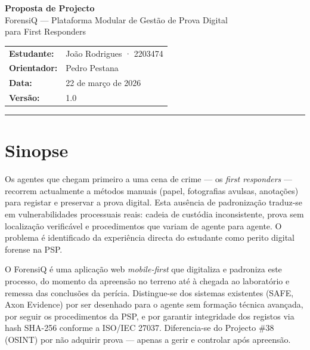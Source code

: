 \documentclass[a4paper,11pt]{article}
\begin{document}

\begin{center}
    {\LARGE\bfseries Proposta de Projecto}\\[0.8em]
    {\large ForensiQ --- Plataforma Modular de Gestão de Prova Digital\\
    para First Responders}\\[1.2em]
    \begin{tabular}{ll}
        \textbf{Estudante:}   & João Rodrigues · 2203474 \\
        \textbf{Orientador:}  & Pedro Pestana \\
        \textbf{Data:}        & 22 de março de 2026 \\
        \textbf{Versão:}      & 1.0 \\
    \end{tabular}
\end{center}

\vspace{0.5em}
\hrule
\vspace{1.5em}

\section{Sinopse}

Os agentes que chegam primeiro a uma cena de crime --- os \emph{first responders} ---
recorrem actualmente a métodos manuais (papel, fotografias avulsas, anotações) para
registar e preservar a prova digital. Esta ausência de padronização traduz-se em
vulnerabilidades processuais reais: cadeia de custódia inconsistente, prova sem
localização verificável e procedimentos que variam de agente para agente. O problema
é identificado da experiência directa do estudante como perito digital forense na PSP.

O ForensiQ é uma aplicação web \emph{mobile-first} que digitaliza e padroniza este
processo, do momento da apreensão no terreno até à chegada ao laboratório e remessa
das conclusões da perícia. Distingue-se dos sistemas existentes (SAFE, Axon Evidence)
por ser desenhado para o agente sem formação técnica avançada, por seguir os
procedimentos da PSP, e por garantir integridade dos registos via hash SHA-256
conforme a ISO/IEC 27037. Diferencia-se do Projecto \#38 (OSINT) por não adquirir
prova --- apenas a gerir e controlar após apreensão.
\end{document}
